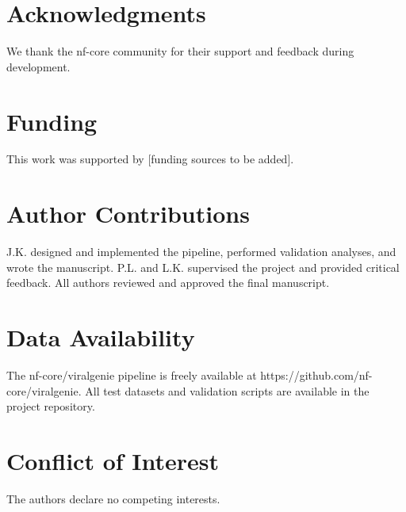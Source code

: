 \section*{Acknowledgments}
We thank the nf-core community for their support and feedback during development.

\section*{Funding}
This work was supported by [funding sources to be added].

\section*{Author Contributions}
J.K. designed and implemented the pipeline, performed validation analyses, and wrote the manuscript. P.L. and L.K. supervised the project and provided critical feedback. All authors reviewed and approved the final manuscript.

\section*{Data Availability}
The nf-core/viralgenie pipeline is freely available at https://github.com/nf-core/viralgenie. All test datasets and validation scripts are available in the project repository.

\section*{Conflict of Interest}
The authors declare no competing interests.
